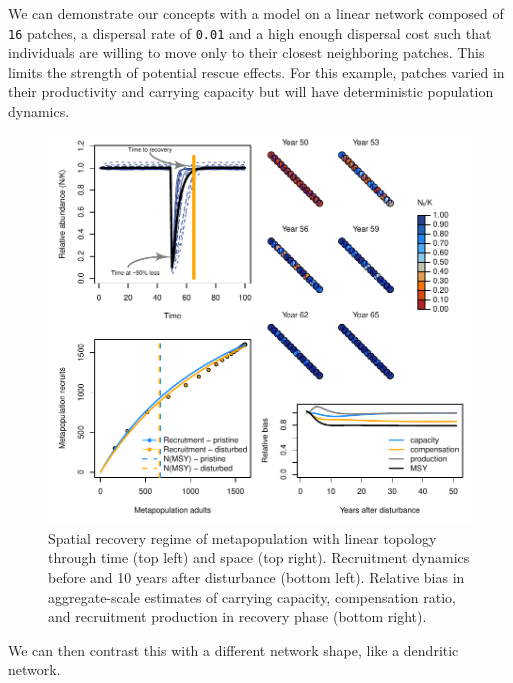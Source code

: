 \documentclass[]{article}
\begin{document}
We can demonstrate our concepts with a model on a linear network
composed of \texttt{16} patches, a dispersal rate of \texttt{0.01} and a
high enough dispersal cost such that individuals are willing to move
only to their closest neighboring patches. This limits the strength of
potential rescue effects. For this example, patches varied in their
productivity and carrying capacity but will have deterministic
population dynamics.

\begin{figure}[H]

{\centering \includegraphics{Managing_for_ecological_surprises_in_metapopulations_makeHTML_files/figure-latex/example results1-1} 

}

\caption{Spatial recovery regime of metapopulation with linear topology through time (top left) and space (top right). Recruitment dynamics before and 10 years after disturbance (bottom left). Relative bias in aggregate-scale estimates of carrying capacity, compensation ratio, and recruitment production in recovery phase (bottom right).}\label{fig:example results1}
\end{figure}

We can then contrast this with a different network shape, like a
dendritic network.
\end{document}
